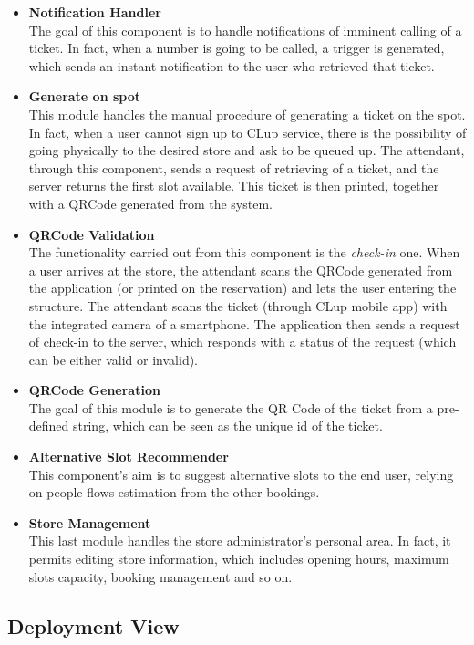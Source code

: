 \documentclass[table, 12pt]{article}
\begin{document}
\begin{itemize}
    \item \textbf{Notification Handler}\\The goal of this component is to handle notifications of imminent calling of a ticket. In fact, when a number is going to be called, a trigger is generated, which sends an instant notification to the user who retrieved that ticket.
    \item \textbf{Generate on spot}\\This module handles the manual procedure of generating a ticket on the spot. In fact, when a user cannot sign up to CLup service, there is the possibility of going physically to the desired store and ask to be queued up. The attendant, through this component, sends a request of retrieving of a ticket, and the server returns the first slot available. This ticket is then printed, together with a QRCode generated from the system.
    \item \textbf{QRCode Validation}\\The functionality carried out from this component is the \textit{check-in} one. When a user arrives at the store, the attendant scans the QRCode generated from the application (or printed on the reservation) and lets the user entering the structure. The attendant scans the ticket (through CLup mobile app) with the integrated camera of a smartphone. The application then sends a request of check-in to the server, which responds with a status of the request (which can be either valid or invalid).
    \item \textbf{QRCode Generation}\\The goal of this module is to generate the QR Code of the ticket from a pre-defined string, which can be seen as the unique id of the ticket.
    \item \textbf{Alternative Slot Recommender}\\This component's aim is to suggest alternative slots to the end user, relying on people flows estimation from the other bookings.
    \item \textbf{Store Management}\\This last module handles the store administrator's personal area. In fact, it permits editing store information, which includes opening hours, maximum slots capacity, booking management and so on.
\end{itemize}

\subsection{Deployment View}
\end{document}
